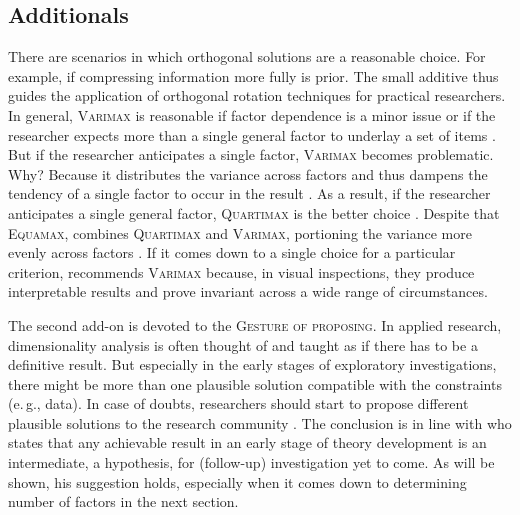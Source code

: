 \documentclass[jou, 11pt]{apa7}
\begin{document}
\subsection{Additionals}

There are scenarios in which orthogonal solutions are a reasonable choice. For
example, if compressing information more fully is prior. The small additive
thus guides the application of orthogonal rotation techniques for practical
researchers. In general, \textsc{Varimax} is reasonable if factor dependence is
a minor issue or if the researcher expects more than a single general factor to
underlay a set of items \parencite[p. 195]{Gorsuch2015}. But if the researcher
anticipates a single factor, \textsc{Varimax} becomes problematic. Why? Because
it distributes the variance across factors and thus dampens the tendency of a
single factor to occur in the result \parencite{Sass2010}. As a result, if the
researcher anticipates a single general factor, \textsc{Quartimax} is the
better choice \parencite{Mair2018}. Despite that \textsc{Equamax}, combines
\textsc{Quartimax} and \textsc{Varimax}, portioning the variance more evenly
across factors \parencite[p. 214]{Gorsuch2015}. If it comes down to a single
choice for a particular criterion, \textcite{Gorsuch2015} recommends
\textsc{Varimax} because, in visual inspections, they produce interpretable
results and prove invariant across a wide range of circumstances.

The second add-on is devoted to the \textsc{Gesture of proposing}. In applied
research, dimensionality analysis is often thought of and taught as if there
has to be a definitive result. But especially in the early stages of
exploratory investigations, there might be more than one plausible solution
compatible with the constraints (e.\,g., data). In case of doubts, researchers
should start to propose different plausible solutions to the research community
\parencite[for an exception, see][]{Timmerman2017}. The conclusion is in line
with \textcite[p. 224]{Gorsuch2015} who states that any achievable result in an
early stage of theory development is an intermediate, a hypothesis, for
(follow-up) investigation yet to come. As will be shown, his suggestion holds,
especially when it comes down to determining \textit{} number of factors in the
next section.

\printendnotes 
\printbibliography
\end{document}
